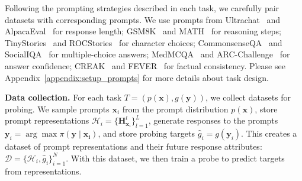     
    Following the prompting strategies described in each task, we carefully pair datasets with corresponding prompts. We use prompts from Ultrachat~\cite{ding2023enhancing} and AlpacaEval~\cite{alpaca} for response length; GSM8K~\cite{cobbe2021gsm8k} and MATH~\cite{2019arXivMATH} for reasoning steps; TinyStories~\cite{eldan2023tinystoriessmalllanguagemodels} and ROCStories~\cite{mostafazadeh2016corpus} for character choices; CommonsenseQA~\cite{talmor-etal-2019-commonsenseqa} and SocialIQA~\cite{sap2019socialiqacommonsensereasoningsocial} for multiple-choice answers; MedMCQA~\cite{pmlr-v174-pal22a} and ARC-Challenge~\cite{allenai:arc} for answer confidence;  CREAK~\cite{onoe2021creakdatasetcommonsensereasoning} and FEVER~\cite{Thorne19FEVER2} for factual consistency.
    Please see Appendix~\ref{appendix:setup_prompts} for more details about task design.
    
    \textbf{Data collection.} For each task $T = (p(\mathbf{x}), g(\mathbf{y}))$, we collect datasets for probing. We sample prompts $\mathbf{x}_i$ from the prompt distribution $p(\mathbf{x})$, store prompt representations $\mathcal{H}_i = \{ \mathbf{H}^l_{\mathbf{x}_i}\}^L_{l=1}$, generate responses to the prompts $\mathbf{y}_i = \arg \max \pi(\mathbf{y} \mid \mathbf{x_i})$, and store probing targets $\hat{g}_i = g(\mathbf{y}_i)$. This creates a dataset of prompt representations and their future response attributes: $\mathcal{D} = \{\mathcal{H}_i, \hat{g}_i \}^{N}_{i=1}$.
    With this dataset, we then train a probe to predict targets from representations.
    
